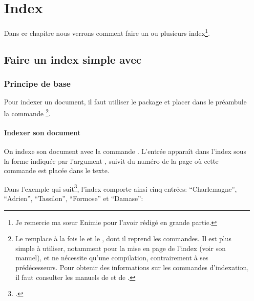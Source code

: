 \chapter{Index}

\begin{intro}

Dans ce chapitre nous verrons comment faire un ou plusieurs index\footnote{Je remercie ma sœur Enimie pour l'avoir rédigé en grande partie.}.

\end{intro}


\section{Faire un index simple avec }


\subsection{Principe de base}


Pour indexer un document, il faut utiliser le package  et placer  dans le préambule la commande \footnote{Le  remplace à la fois le   et le  , dont il reprend les commandes. Il est plus simple à utiliser, notamment pour la mise en page de l'index (voir son manuel), et ne nécessite qu'une compilation, contrairement à ses prédécesseurs. Pour obtenir des informations sur les commandes d'indexation, il faut consulter les manuels de  et de .}.

\begin{latexcode}
\usepackage{imakeidx}
\makeindex
\end{latexcode}

\subsubsection{Indexer son document}



On indexe son document avec  la commande \label{cmdindex}. L'entrée apparaît dans l'index sous la forme indiquée par l'argument , suivit du numéro de la page où cette commande est placée dans le texte. 

Dans l'exemple qui suit\footcite{eginhard}, l'index comporte ainsi cinq entrées: \enquote{Charlemagne}, \enquote{Adrien}, \enquote{Tassilon}, \enquote{Formose} et \enquote{Damase}:

